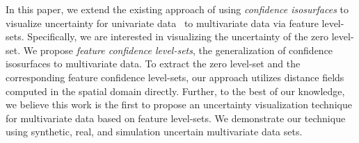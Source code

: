 In this paper, we extend the existing approach of using \textit{confidence isosurfaces} to visualize uncertainty for univariate data~\cite{zehner2010visualization} to multivariate data via feature level-sets.
%
Specifically, we are interested in visualizing the uncertainty of the zero level-set.
%
We propose \textit{feature confidence level-sets}, the generalization of confidence isosurfaces to multivariate data.
%
%
To extract the zero level-set and the corresponding feature confidence level-sets, our approach utilizes distance fields computed in the spatial domain directly.
%
%
%
%
%
Further, to the best of our knowledge, we believe this work is the first to propose an uncertainty visualization technique for multivariate data based on feature level-sets. 
%
We demonstrate our technique using synthetic, real, and simulation uncertain multivariate data sets.

